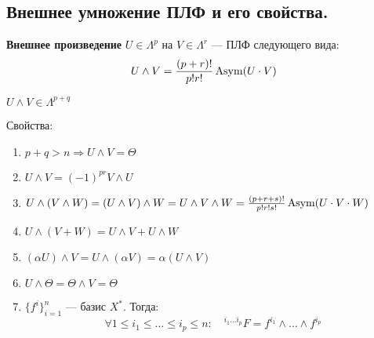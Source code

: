\subsection{Внешнее умножение ПЛФ и его свойства.}
\begin{definition}
    \textbf{Внешнее произведение} $U\in\Lambda^p$ на $V\in\Lambda^r$ --- ПЛФ следующего вида:
    $$U\wedge V=\frac{(p+r)!}{p!r!}\operatorname{\text{Asym}}(U\cdot V)$$

    $U\wedge V\in\Lambda^{p+q}$
\end{definition}
Свойства:
\begin{enumerate}
    \item $p+q>n\Rightarrow U\wedge V=\Theta$
    \item $U\wedge V=(-1)^{pr} V\wedge U$
    \item $U\wedge (V\wedge W)=(U\wedge V)\wedge W=U\wedge V\wedge W=\frac{(p+r+s)!}{p!r!s!}\operatorname{\text{Asym}}(U\cdot V\cdot W)$
    \item $U\wedge (V+W)=U\wedge V + U\wedge W$
    \item $(\alpha U)\wedge V=U\wedge (\alpha V)=\alpha(U\wedge V)$
    \item $U\wedge\Theta=\Theta\wedge V=\Theta$
    \item $\{f^i\}_{i=1}^n$ --- базис $X^*$. Тогда:
    $$\forall 1\leq i_1\leq \ldots \leq i_p\leq n:\quad {}^{i_1\ldots i_p}F=f^{i_1}\wedge\ldots \wedge f^{i_p}$$
\end{enumerate}
